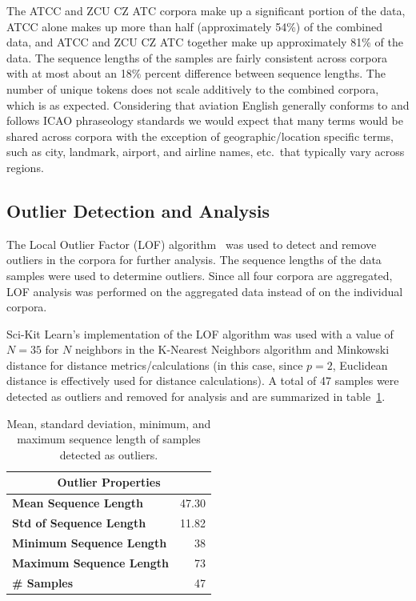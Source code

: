 \documentclass[12pt]{article}
\begin{document}
The ATCC and ZCU CZ ATC corpora make up a significant portion of the data, ATCC alone makes up more than half (approximately 54\%) of the combined
data, and ATCC and ZCU CZ ATC together make up approximately 81\% of the data. The sequence lengths of the samples are fairly consistent across
corpora with at most about an 18\% percent difference between sequence lengths. The number of unique tokens does not scale additively to the
combined corpora, which is as expected. Considering that aviation English generally conforms to and follows ICAO phraseology standards we would expect
that many terms would be shared across corpora with the exception of geographic/location specific terms, such as city, landmark, airport, and airline
names, etc.~that typically vary across regions.

\subsection{Outlier Detection and Analysis}\label{sec:outliers}
The Local Outlier Factor (LOF) algorithm~\cite{breunig_lof_2000} was used to detect and remove outliers in the corpora for further analysis. The
sequence lengths of the data samples were used to determine outliers. Since all four corpora are aggregated, LOF analysis was performed on the
aggregated data instead of on the individual corpora.

Sci-Kit Learn's implementation of the LOF
algorithm was used with a value of \(N = 35\) for \(N\) neighbors in the K-Nearest Neighbors algorithm and Minkowski distance for distance
metrics/calculations (in this case, since \(p=2\), Euclidean distance is effectively used for distance calculations). A total of 47 samples were
detected as outliers and removed for analysis and are summarized in table~\ref{tab:outlier_stats}.

\begin{table}[h!]
    \centering
    \begin{tabular}{l | r}
        \toprule
        \multicolumn{2}{c}{Outlier Properties}   \\
        \midrule
        \textbf{Mean Sequence Length}    & 47.30 \\
        \textbf{Std of Sequence Length}  & 11.82 \\
        \textbf{Minimum Sequence Length} & 38    \\
        \textbf{Maximum Sequence Length} & 73    \\
        \textbf{\# Samples}              & 47    \\
        \bottomrule
    \end{tabular}
    \caption{Mean, standard deviation, minimum, and maximum sequence length of samples detected as outliers.}
    \label{tab:outlier_stats}
\end{table}
\end{document}
